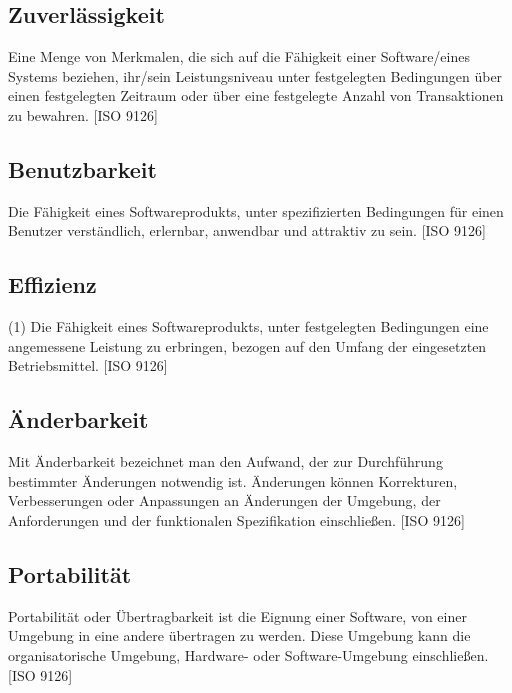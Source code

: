 \documentclass[10pt]{scrreprt}
\begin{document}
\subsection*{Zuverlässigkeit}
Eine Menge von Merkmalen, die sich auf die Fähigkeit einer Software/eines Systems beziehen, ihr/sein Leistungsniveau unter festgelegten Bedingungen über einen festgelegten Zeitraum oder über eine festgelegte Anzahl von Transaktionen zu bewahren. [ISO 9126]

\subsection*{Benutzbarkeit}
Die Fähigkeit eines Softwareprodukts, unter spezifizierten Bedingungen für einen Benutzer verständlich, erlernbar, anwendbar und attraktiv zu sein. [ISO 9126]

\subsection*{Effizienz}
(1) Die Fähigkeit eines Softwareprodukts, unter festgelegten Bedingungen eine angemessene Leistung zu erbringen, bezogen auf den Umfang der eingesetzten Betriebsmittel. [ISO 9126]

\subsection*{Änderbarkeit}
Mit Änderbarkeit bezeichnet man den Aufwand, der zur Durchführung bestimmter Änderungen notwendig ist. Änderungen können Korrekturen, Verbesserungen oder Anpassungen an Änderungen der Umgebung, der Anforderungen und der funktionalen Spezifikation einschließen. [ISO 9126]

\subsection*{Portabilität}
Portabilität oder Übertragbarkeit ist die Eignung einer Software, von einer Umgebung in eine andere übertragen zu werden. Diese Umgebung kann die organisatorische Umgebung, Hardware- oder Software-Umgebung einschließen. [ISO 9126]

\newpage
\pagestyle{empty}

\end{document}
